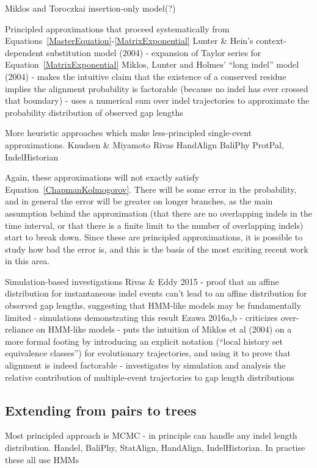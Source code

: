 \documentclass{bmcart}
\newcommand{\eqref}[1]{Equation~\ref{#1}}
\begin{document}
Miklos and Toroczkai insertion-only model(?) \cite{MiklosEtal2001}

Principled approximations that proceed systematically from Equations~\ref{MasterEquation}-\ref{MatrixExponential}
Lunter \& Hein's context-dependent substitution model (2004)
 - expansion of Taylor series for \eqref{MatrixExponential}
Miklos, Lunter and Holmes' ``long indel'' model (2004)
 - makes the intuitive claim that the existence of a conserved residue implies the alignment probability is factorable (because no indel has ever crossed that boundary)
 - uses a numerical sum over indel trajectories to approximate the probability distribution of observed gap lengths

More heuristic approaches which make less-principled single-event approximations.
Knudsen \& Miyamoto
Rivas
HandAlign
BaliPhy
ProtPal, IndelHistorian

Again, these approximations will not exactly satisfy \eqref{ChapmanKolmogorov}.
There will be some error in the probability, and in general the error will be greater
on longer branches, as the main assumption behind the approximation
(that there are no overlapping indels in the time interval, or that there is a finite
limit to the number of overlapping indels)
start to break down.
Since these are principled approximations, it is possible to study
how bad the error is, and this is the basis of the most exciting recent work in this area.


Simulation-based investigations
Rivas \& Eddy 2015
 - proof that an affine distribution for instantaneous indel events can't lead to an affine distribution for observed gap lengths, suggesting that HMM-like models may be fundamentally limited
 - simulations demonstrating this result
Ezawa 2016a,b
 - criticizes over-reliance on HMM-like models
 - puts the intuition of Miklos et al (2004) on a more formal footing by introducing an explicit notation (``local history set equivalence classes'') for evolutionary trajectories, and using it to prove that alignment is indeed factorable
 - investigates by simulation and analysis the relative contribution of multiple-event trajectories to gap length distributions


\subsection*{Extending from pairs to trees}

Most principled approach is MCMC - in principle can handle any indel length distribution.
Handel,
BaliPhy,
StatAlign,
HandAlign,
IndelHistorian.
In practise these all use HMMs
\end{document}
